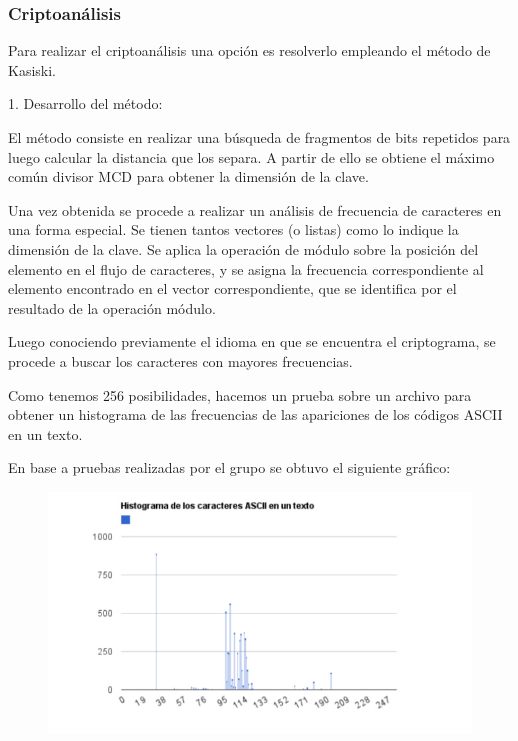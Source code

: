 \documentclass[a4paper,10pt]{article}
\begin{document}
\subsubsection{Criptoanálisis}


Para realizar el criptoanálisis una opción es resolverlo empleando el método de Kasiski.

1. Desarrollo del método:

El método consiste en realizar una búsqueda de fragmentos de bits repetidos para luego calcular la distancia que los separa. A partir de ello se obtiene el máximo común divisor MCD para obtener la dimensión de la clave.

Una vez obtenida se procede a realizar un análisis de frecuencia de caracteres en una forma especial. Se tienen tantos vectores (o listas) como lo indique la dimensión de la clave. Se aplica la operación de módulo sobre la posición del elemento en el flujo de caracteres, y se asigna la frecuencia correspondiente al elemento encontrado en el vector correspondiente, que se identifica por el resultado de la operación módulo.

Luego conociendo previamente el idioma en que se encuentra el criptograma, se procede a buscar los caracteres con mayores frecuencias.

Como tenemos 256 posibilidades, hacemos un prueba sobre un archivo para obtener un histograma de las frecuencias de las apariciones de los códigos ASCII en un texto.

En base a pruebas realizadas por el grupo se obtuvo el siguiente gráfico:
\begin{center}
\begin{figure}[h] %
\includegraphics[scale=0.5]{./histo.jpg}
\end{figure}
\end{center}
\end{document}
